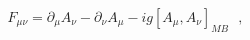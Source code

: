 \begin{equation}
F_{\mu\nu} = \partial_{\mu} A_{\nu} -  \partial_{\nu} A_{\mu}  - i g [A_{\mu}
 , A_{\nu}]_{MB} ~~~,
\end{equation}

